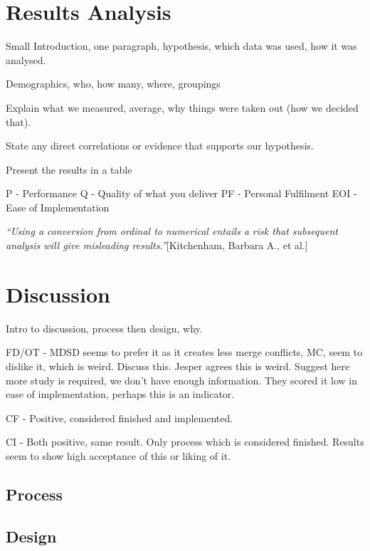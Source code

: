 \documentclass[final_report_innit.tex]{subfiles}
\begin{document}
\section{Results Analysis}

Small Introduction, one paragraph, hypothesis, which data was used, how it was analysed.

Demographics, who, how many, where, groupings

Explain what we measured, average, why things were taken out (how we decided that).

State any direct correlations or evidence that supports our hypothesis.

Present the results in a table

P - Performance
Q - Quality of what you deliver
PF - Personal Fulfilment
EOI - Ease of Implementation

\textit{``Using a conversion from ordinal to numerical entails a risk that subsequent analysis will give misleading results.''}[Kitchenham, Barbara A., et al.]

\section{Discussion}

Intro to discussion, process then design, why.



FD/OT - MDSD seems to prefer it as it creates less merge conflicts, MC, seem to dislike it, which is weird. Discuss this. Jesper agrees this is weird. Suggest here more study is required, we don't have enough information. They scored it low in ease of implementation, perhaps this is an indicator.

CF - Positive, considered finished and implemented. 

CI - Both positive, same result. Only process which is considered finished. Results seem to show high acceptance of this or liking of it.

\subsection*{Process}

\subsection*{Design}
\end{document}
